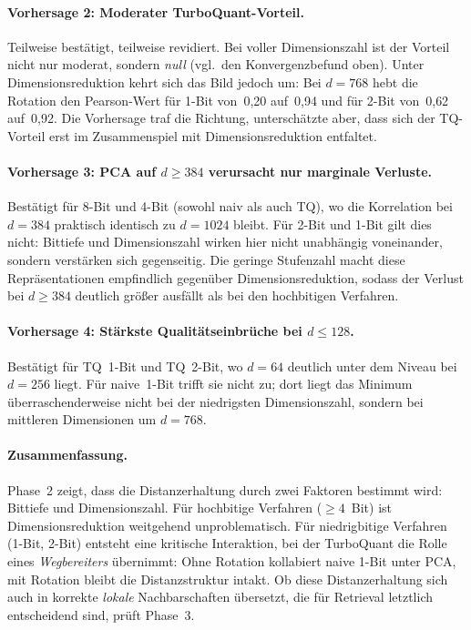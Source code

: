 \paragraph{Vorhersage 2: Moderater TurboQuant-Vorteil.}
Teilweise bestätigt, teilweise revidiert.
Bei voller Dimensionszahl ist der Vorteil nicht nur moderat, sondern \emph{null} (vgl.\ den Konvergenzbefund oben).
Unter Dimensionsreduktion kehrt sich das Bild jedoch um: Bei $d = 768$ hebt die Rotation den Pearson-Wert für 1-Bit von~0{,}20 auf~0{,}94 und für 2-Bit von~0{,}62 auf~0{,}92.
Die Vorhersage traf die Richtung, unterschätzte aber, dass sich der TQ-Vorteil erst im Zusammenspiel mit Dimensionsreduktion entfaltet.
%
\paragraph{Vorhersage 3: PCA auf $d \geq 384$ verursacht nur marginale Verluste.}
Bestätigt für 8-Bit und 4-Bit (sowohl naiv als auch TQ), wo die Korrelation bei $d = 384$ praktisch identisch zu $d = 1024$ bleibt.
Für 2-Bit und 1-Bit gilt dies nicht: Bittiefe und Dimensionszahl wirken hier nicht unabhängig voneinander, sondern verstärken sich gegenseitig. Die geringe Stufenzahl macht diese Repräsentationen empfindlich gegenüber Dimensionsreduktion, sodass der Verlust bei $d \geq 384$ deutlich größer ausfällt als bei den hochbitigen Verfahren.
%
\paragraph{Vorhersage 4: Stärkste Qualitätseinbrüche bei $d \leq 128$.}
Bestätigt für TQ~1-Bit und TQ~2-Bit, wo $d = 64$ deutlich unter dem Niveau bei $d = 256$ liegt.
Für naive~1-Bit trifft sie nicht zu; dort liegt das Minimum überraschenderweise nicht bei der niedrigsten Dimensionszahl, sondern bei mittleren Dimensionen um $d = 768$.
%
\paragraph{Zusammenfassung.}
Phase~2 zeigt, dass die Distanzerhaltung durch zwei Faktoren bestimmt wird: Bittiefe und Dimensionszahl.
Für hochbitige Verfahren ($\geq 4$~Bit) ist Dimensionsreduktion weitgehend unproblematisch.
Für niedrigbitige Verfahren (1-Bit, 2-Bit) entsteht eine kritische Interaktion, bei der TurboQuant die Rolle eines \emph{Wegbereiters} übernimmt: Ohne Rotation kollabiert naive 1-Bit unter PCA, mit Rotation bleibt die Distanzstruktur intakt.
%
Ob diese Distanzerhaltung sich auch in korrekte \emph{lokale} Nachbarschaften übersetzt, die für Retrieval letztlich entscheidend sind, prüft Phase~3.
%
